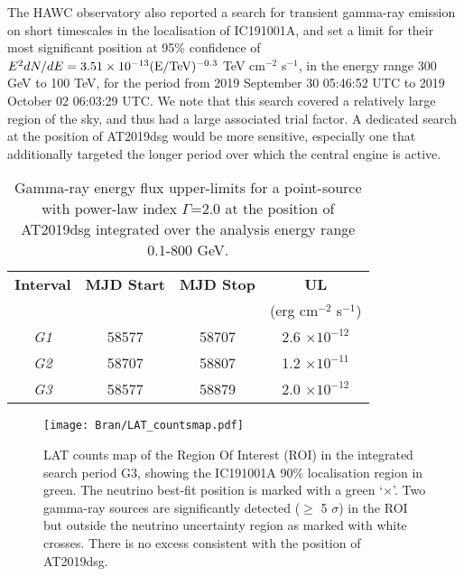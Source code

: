 The HAWC observatory also reported a search for transient gamma-ray emission on short timescales in the localisation of IC191001A\cite{ayala:gcn25936}, and set a limit for their most significant position at 95\% confidence of $E^{2} dN/dE = 3.51 \times 10^{-13} (\textup{E}/\textup{TeV})^{-0.3}$ TeV cm$^{-2}$ s$^{-1}$, in the energy range 300 GeV to 100 TeV, for the period from 2019 September 30 05:46:52 UTC to 2019 October 02 06:03:29 UTC. We note that this search covered a relatively large region of the sky, and thus had a large associated trial factor. A dedicated search at the position of AT2019dsg would be more sensitive, especially one that additionally targeted the longer period over which the central engine is active.

\begin{table}
	\centering
	\begin{tabular}{||c c c c||} 
		\hline
		\textbf{Interval} & \textbf{MJD Start} & \textbf{MJD Stop} & \textbf{UL}\\
		& & &  (erg cm$^{-2}$ s$^{-1}$)\\
		\hline
		\textit{G1} & 58577 & 58707 & 2.6 $\times 10^{-12}$\\
		\textit{G2} & 58707 & 58807 & 1.2 $\times 10^{-11}$\\
		\textit{G3} & 58577 & 58879 & 2.0 $\times 10^{-12}$\\
		\hline
	\end{tabular}
	\caption{Gamma-ray energy flux upper-limits for a point-source with power-law index $\Gamma$=2.0 at the position of AT2019dsg integrated over the analysis energy range 0.1-800 GeV.}
	\label{tab:lat_uls}
\end{table}

\begin{figure}
	\centering
	\texttt{[image: Bran/LAT\_countsmap.pdf]}
	\caption{LAT counts map of the Region Of Interest (ROI) in the integrated search period G3, showing the IC191001A 90$\%$ localisation region in green. The neutrino best-fit position is marked with a green `$\times$'. Two gamma-ray sources are significantly detected ($\geq$ 5 $\sigma$) in the ROI but outside the neutrino uncertainty region as marked with white crosses. There is no excess consistent with the position of AT2019dsg. %
	}
	\label{fig:fermi}
\end{figure}

